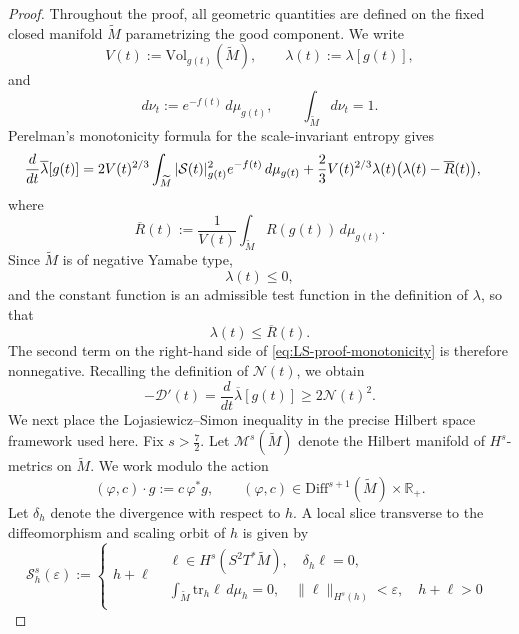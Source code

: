 \documentclass{amsart}
\newcommand{\tr}{\mbox{tr}}
\begin{document}
\begin{proof}
Throughout the proof, all geometric quantities are defined on the fixed
closed manifold \(\widetilde M\) parametrizing the good component.  We write
\[
        V(t):=\text{Vol}_{g(t)}(\widetilde M),
        \qquad
        \lambda(t):=\lambda[g(t)],
\]
and
\[
        d\nu_t:=e^{-f(t)}\,d\mu_{g(t)},
        \qquad
        \int_{\widetilde M}d\nu_t=1.
\]
Perelman's monotonicity formula for the scale-invariant entropy gives
\begin{eqnarray}
        \frac{d}{dt}\overline\lambda[g(t)]
        &=
        2V(t)^{2/3}
        \int_{\widetilde M}
        |\mathcal S(t)|_{g(t)}^2
        e^{-f(t)}\,d\mu_{g(t)}
        \notag
        +
        \frac{2}{3}V(t)^{2/3}\lambda(t)
        \bigl(\lambda(t)-\overline R(t)\bigr),
\label{eq:LS-proof-monotonicity}
\end{eqnarray}
where
\[
        \overline R(t)
        :=
        \frac{1}{V(t)}
        \int_{\widetilde M}R(g(t))\,d\mu_{g(t)}.
\]
Since \(\widetilde M\) is of negative Yamabe type,
\[
        \lambda(t)\leq0,
\]
and the constant function is an admissible test function in the definition
of \(\lambda\), so that
\[
        \lambda(t)\leq\overline R(t).
\]
The second term on the right-hand side of
\eqref{eq:LS-proof-monotonicity} is therefore nonnegative. Recalling the
definition of \(\mathcal N(t)\), we obtain
\begin{equation}
\label{eq:LS-proof-dissipation}
        -\mathcal D'(t)
        =
        \frac{d}{dt}\overline\lambda[g(t)]
        \geq
        2\mathcal N(t)^2.
\end{equation}
We next place the Lojasiewicz--Simon inequality in the precise Hilbert
space framework used here. Fix
$s>\frac{7}{2}$.
Let \(\mathcal M^s(\widetilde M)\) denote the Hilbert manifold of
\(H^s\)-metrics on \(\widetilde M\). We work modulo the action
\[
        (\varphi,c)\cdot g:=c\,\varphi^*g,
        \qquad
        (\varphi,c)\in
        \text{Diff}^{s+1}(\widetilde M)\times\mathbb R_+.
\]
Let \(\delta_h\) denote the divergence with respect to \(h\). A local
slice transverse to the diffeomorphism and scaling orbit of \(h\) is
given by
\[
\mathscr S_h^s(\varepsilon)
:=
\left\{
\begin{array}{l|l}
h+\ell
&
\begin{array}{l}
\ell\in H^s(S^2T^*\widetilde M),\quad
\delta_h\ell=0,\\[1mm]
\displaystyle
\int_{\widetilde M}\tr_h\ell\,d\mu_h=0,\quad
\|\ell\|_{H^s(h)}<\varepsilon,\quad
h+\ell>0
\end{array}

\end{array}\]
\end{proof}
\end{document}
